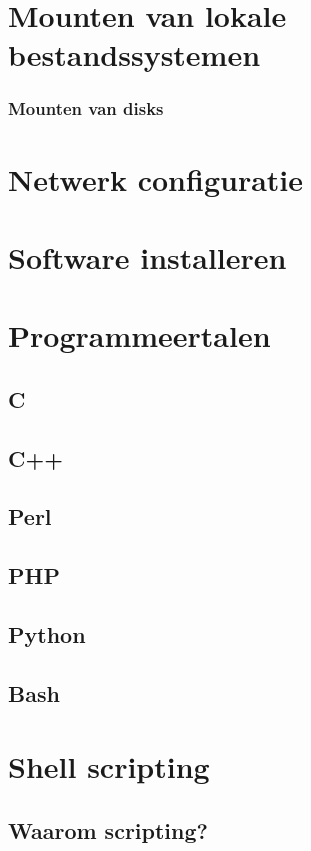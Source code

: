 \documentclass[a4paper,12pt,twoside,openright,titlepage]{book}
\begin{document}
\chapter{Mounten van lokale bestandssystemen}

\subsection{Mounten van disks}


\chapter{Netwerk configuratie}

\chapter{Software installeren}

\chapter{Programmeertalen}

\section{C}
\section{C++}
\section{Perl}
\section{PHP}
\section{Python}
\section{Bash}

\chapter{Shell scripting}

\section{Waarom scripting?}

\end{document}

